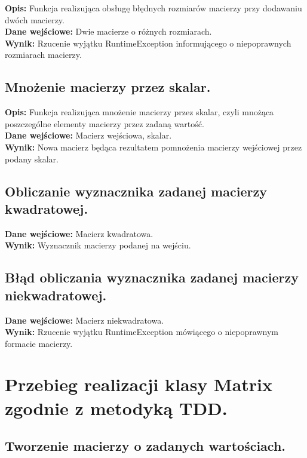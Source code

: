 \documentclass[a4paper,12pt,twoside]{article}
\begin{document}
\textbf{Opis:} Funkcja realizująca obsługę błędnych rozmiarów macierzy przy dodawaniu dwóch macierzy.\\
\textbf{Dane wejściowe:} Dwie macierze o różnych rozmiarach.\\
\textbf{Wynik:} Rzucenie wyjątku RuntimeException informującego o niepoprawnych rozmiarach macierzy.

\subsection{Mnożenie macierzy przez skalar.}

\textbf{Opis:} Funkcja realizująca mnożenie macierzy przez skalar, czyli mnożąca poszczególne
elementy macierzy przez zadaną wartość.\\
\textbf{Dane wejściowe:} Macierz wejściowa, skalar.\\
\textbf{Wynik:} Nowa macierz będąca rezultatem pomnożenia macierzy wejściowej przez podany skalar.

\subsection{Obliczanie wyznacznika zadanej macierzy kwadratowej.}

\textbf{Dane wejściowe:} Macierz kwadratowa.\\
\textbf{Wynik:} Wyznacznik macierzy podanej na wejściu.

\subsection{Błąd obliczania wyznacznika zadanej macierzy niekwadratowej.}

\textbf{Dane wejściowe:} Macierz niekwadratowa.\\
\textbf{Wynik:} Rzucenie wyjątku RuntimeException mówiącego o niepoprawnym formacie macierzy.


\section{Przebieg realizacji klasy Matrix zgodnie z metodyką TDD.}
\bigskip


\subsection{Tworzenie macierzy o zadanych wartościach.}
\bigskip
\end{document}
